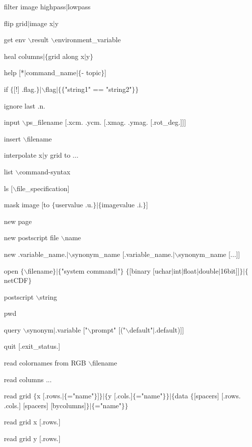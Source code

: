 filter image highpass$\mid$lowpass

flip grid$\mid$image x$\mid$y

get env $\backslash$result $\backslash$environment\_variable

heal columns$\mid$$\lbrace$grid along x$\mid$y$\rbrace$

help [*$\mid$command\_name$\mid$$\lbrace$- topic$\rbrace$]

if $\lbrace$[!] .flag.$\rbrace$$\mid$$\backslash$flag$\mid$$\lbrace$$\lbrace$"string1" == "string2"$\rbrace$$\rbrace$

ignore last .n.

input $\backslash$ps\_filename [.xcm. .ycm. [.xmag. .ymag. [.rot\_deg.]]]

insert $\backslash$filename

interpolate x$\mid$y grid to ...

list $\backslash$command-syntax

ls [$\backslash$file\_specification]

mask image [to $\lbrace$uservalue .u.$\rbrace$$\mid$$\lbrace$imagevalue .i.$\rbrace$]

new page

new postscript file $\backslash$name

new .variable\_name.$\mid$$\backslash$synonym\_name [.variable\_name.$\mid$$\backslash$synonym\_name [...]]

open $\lbrace$$\backslash$filename$\rbrace$$\mid$$\lbrace$"system command$\mid$"$\rbrace$ $\lbrace$[binary [uchar$\mid$int$\mid$float$\mid$double$\mid$16bit]]$\rbrace$$\mid$$\lbrace$netCDF$\rbrace$

postscript $\backslash$string

pwd

query $\backslash$synonym$\mid$.variable ["$\backslash$prompt" [("$\backslash$default"$\mid$.default)]]

quit [.exit\_status.]

read colornames from RGB $\backslash$filename

read columns ...

read grid $\lbrace$x [.rows.$\mid$$\lbrace$="name"$\rbrace$]$\rbrace$$\mid$$\lbrace$y [.cols.]$\lbrace$="name"$\rbrace$$\rbrace$$\mid$$\lbrace$data $\lbrace$[spacers] [.rows. .cols.] [spacers] [bycolumns]$\rbrace$$\mid$$\lbrace$="name"$\rbrace$$\rbrace$

read grid x [.rows.]

read grid y [.rows.]

